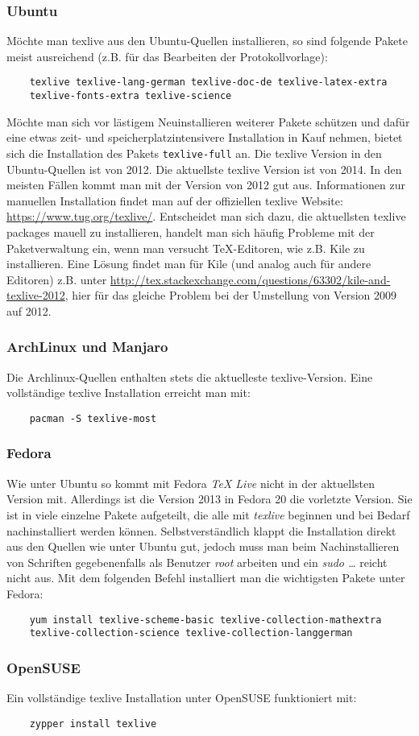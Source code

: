 \subsubsection{Ubuntu}
Möchte man texlive aus den Ubuntu-Quellen installieren, so sind folgende Pakete meist ausreichend (z.B. für das Bearbeiten der Protokollvorlage):
\begin{verbatim}
	texlive texlive-lang-german texlive-doc-de texlive-latex-extra
	texlive-fonts-extra texlive-science
\end{verbatim}
Möchte man sich vor lästigem Neuinstallieren weiterer Pakete schützen und dafür eine etwas zeit- und speicherplatzintensivere Installation in Kauf nehmen, bietet sich die Installation des Pakets \verb|texlive-full| an. Die texlive Version in den Ubuntu-Quellen ist von 2012. Die aktuellste texlive Version ist von 2014. In den meisten Fällen kommt man mit der Version von 2012 gut aus. Informationen zur manuellen Installation findet man auf der offiziellen texlive Website: \url{https://www.tug.org/texlive/}. Entscheidet man sich dazu, die aktuellsten texlive packages mauell zu installieren, handelt man sich häufig Probleme mit der Paketverwaltung ein, wenn man versucht TeX-Editoren, wie z.B. Kile zu installieren. Eine Lösung findet man für Kile (und analog auch für andere Editoren) z.B. unter \url{http://tex.stackexchange.com/questions/63302/kile-and-texlive-2012}, hier für das gleiche Problem bei der Umstellung von Version 2009 auf 2012.

\subsubsection{ArchLinux und Manjaro}
Die Archlinux-Quellen enthalten stets die aktuelleste texlive-Version. Eine vollständige texlive Installation erreicht man mit:
\begin{verbatim}
	pacman -S texlive-most
\end{verbatim}

\subsubsection{Fedora}
Wie unter Ubuntu so kommt mit Fedora \textit{TeX Live} nicht in der aktuellsten Version mit.
Allerdings ist die Version 2013 in Fedora 20 die vorletzte Version.
Sie ist in viele einzelne Pakete aufgeteilt, die alle mit \textit{texlive} beginnen und bei Bedarf nachinstalliert werden können.
Selbstverständlich klappt die Installation direkt aus den Quellen wie unter Ubuntu gut, jedoch muss man beim Nachinstallieren von Schriften gegebenenfalls als Benutzer \textit{root} arbeiten und ein \textit{sudo \ldots} reicht nicht aus.
Mit dem folgenden Befehl installiert man die wichtigsten Pakete unter Fedora:
\begin{verbatim}
	yum install texlive-scheme-basic texlive-collection-mathextra
	texlive-collection-science texlive-collection-langgerman 
\end{verbatim}

\subsubsection{OpenSUSE}
Ein vollständige texlive Installation unter OpenSUSE funktioniert mit:
\begin{verbatim}
	zypper install texlive
\end{verbatim}